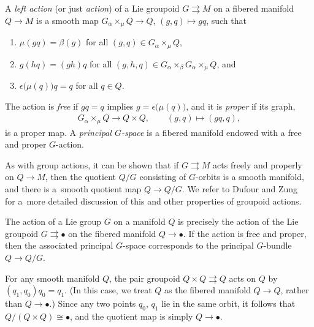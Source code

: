 \documentclass[10pt,a4paper]{amsart}
\numberwithin{equation}{section}
\begin{document}
\begin{Definition} \label{def:groupoidAction}
A \emph{left action} (or just \emph{action}) of a Lie groupoid $ G \rightrightarrows M $ on a f\/ibered manifold $ Q \rightarrow M $ is a smooth map $ G \mathbin{ _\alpha \times _\mu } Q \rightarrow Q $, $ ( g, q ) \mapsto g q $, such that
 \begin{enumerate}[label=(\roman*)]\itemsep=0pt
 \item $ \mu ( g q ) = \beta (g) $ for all $ ( g, q ) \in G \mathbin{ _\alpha \times _\mu } Q $,
 \item $ g ( h q ) = ( g h ) q $ for all $ ( g, h , q ) \in G \mathbin{ _\alpha \times _\beta } G \mathbin{ _\alpha \times _\mu } Q $, and
 \item $ \epsilon \bigl( \mu (q) \bigr) q = q $ for all $ q \in Q $.
 \end{enumerate}
 The action is \emph{free} if $ g q = q $ implies $ g = \epsilon \bigl( \mu (q) \bigr) $, and it is \emph{proper} if its graph,
 \begin{gather*}
 G \mathbin{ _\alpha \times _\mu } Q \rightarrow Q \times Q , \qquad ( g, q ) \mapsto ( g q, q ) ,
 \end{gather*}
is a proper map. A \emph{principal $G$-space} is a f\/ibered manifold endowed with a free and proper $G$-action.
\end{Definition}

\begin{Remark} \label{rmk:freeProperQuotient}
As with group actions, it can be shown that if $G \rightrightarrows M $ acts freely and properly on $Q \rightarrow M $, then the quotient $ Q / G $ consisting of $G$-orbits is a smooth manifold, and there is a~smooth quotient map $ Q \rightarrow Q / G $. We refer to Dufour and Zung~\cite[Chapter~7]{DuZu2005} for a~more detailed discussion of this and other properties of groupoid actions.
\end{Remark}

\begin{Example} \label{ex:groupAction}The action of a Lie group $G$ on a manifold $Q$ is precisely the action of the Lie groupoid $ G \rightrightarrows \bullet $ on the f\/ibered manifold $ Q \rightarrow \bullet $. If the action is free and proper, then the associated principal $G$-space corresponds to the principal $G$-bundle $Q \rightarrow Q /G$.
\end{Example}

\begin{Example} \label{ex:pairAction}
For any smooth manifold $Q$, the pair groupoid $ Q \times Q \rightrightarrows Q $ acts on $Q$ by $ ( q _1 , q _0 ) q _0 = q _1 $. (In this case, we treat $Q$ as the f\/ibered manifold $ Q \rightarrow Q $, rather than $ Q \rightarrow \bullet $.) Since any two points $ q _0$, $q _1 $ lie in the same orbit, it follows that $ Q / ( Q \times Q ) \cong \bullet $, and the quotient map is simply $ Q \rightarrow \bullet $.
\end{Example}
\end{document}
